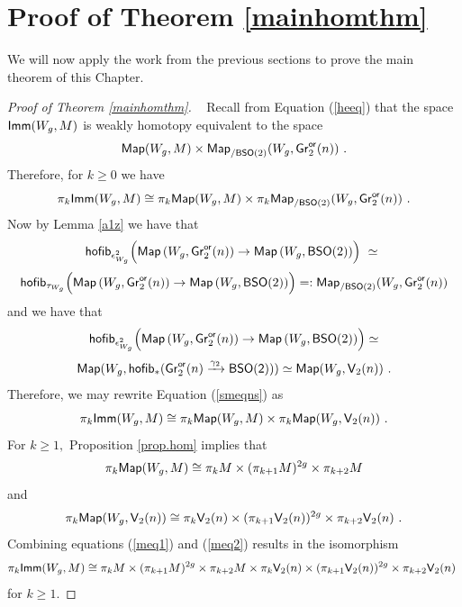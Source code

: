 














\section{Proof of Theorem \ref{mainhomthm}} \label{tmain}
We will now apply the work from the previous sections to prove the main theorem of this Chapter. \newline
\begin{proof}[Proof of Theorem \ref{mainhomthm}] ~\newline \newline
Recall from Equation (\ref{heeq}) that the space ${\sf Imm}(W_{g}, M)$ is weakly homotopy equivalent to the space \[
{\sf Map}(W_{g}, M) \times {\sf Map}_{/{\sf BSO}(2)}(W_{g}, \operatorname{\sf Gr}_2^{\sf or}(n))~.
\]
Therefore, for $k \geq 0$ we have 
\begin{equation} \label{smeqns}
\pi_{k}{\sf Imm}(W_{g}, M) \cong \pi_{k}{\sf Map}(W_{g}, M) \times \pi_{k}{\sf Map}_{/{\sf BSO}(2)}(W_{g}, \operatorname{\sf Gr}_2^{\sf or}(n))~.
\end{equation}
Now by Lemma \ref{a1z} we have that 
\small
\[
{\sf hofib}_{\epsilon^2_{W_g}} \Bigl(
\operatorname{{\sf Map}}\left( W_g , \operatorname{\sf Gr}^{\sf or}_2(n) \right) 
\to
\operatorname{{\sf Map}}\left( W_g , {\sf BSO}(2) \right) 
\Bigr)
~\simeq~
\]
\[
{\sf hofib}_{\tau_{W_g}} \Bigl(
\operatorname{{\sf Map}}\left( W_g , {\sf Gr}^{\sf or}_2(n) \right) 
\to
\operatorname{{\sf Map}}\left( W_g , {\sf BSO}(2) \right) 
\Bigr) =: {\sf Map}_{/ \sf BSO(2)}(W_{g}, {\sf Gr}_{2}^{\sf or}(n))
\]
and we have that
\[
{\sf hofib}_{\epsilon^2_{W_g}} \Bigl(
\operatorname{{\sf Map}}\left( W_g , {\sf Gr}^{\sf or}_2(n) \right) 
\to
\operatorname{{\sf Map}}\left( W_g , {\sf BSO}(2) \right) 
\Bigr) \simeq 
\]
\[
{\sf Map}(W_{g}, {\sf hofib}_{\ast}(\operatorname{\sf Gr}^{\sf or}_2(n) \xrightarrow{\gamma_{2}} {\sf BSO(2)})) \simeq {\sf Map}(W_{g}, \mathsf V_{2}(n)) ~.
\]
Therefore, we may rewrite Equation (\ref{smeqns}) as 
\begin{equation} \label{smeqns1}
\pi_{k}{\sf Imm}(W_{g}, M) \cong \pi_{k}{\sf Map}(W_{g}, M) \times \pi_{k}{\sf Map}(W_{g}, \mathsf V_{2}(n))~.
\end{equation}
For $k \geq 1,$ Proposition \ref{prop.hom} implies that 
\begin{equation}\label{meq1}
\pi_{k}{\sf Map}(W_{g}, M) \cong \pi_{k}M \times (\pi_{k + 1}M)^{2g} \times \pi_{k+2}M
\end{equation}
and
\begin{equation} \label{meq2}
\pi_{k}{\sf Map}(W_{g}, \mathsf V_{2}(n)) \cong \pi_{k}\mathsf V_{2}(n) \times (\pi_{k + 1}\mathsf V_{2}(n))^{2g} \times \pi_{k+2}\mathsf V_{2}(n)~.
\end{equation}
Combining equations (\ref{meq1}) and (\ref{meq2}) results in the isomorphism 
\[
\pi_{k}{\sf Imm}(W_{g}, M) \cong \pi_{k}M \times (\pi_{k + 1}M)^{2g} \times \pi_{k+2}M \times
\pi_{k}\mathsf V_{2}(n) \times (\pi_{k + 1}\mathsf V_{2}(n))^{2g} \times \pi_{k+2}\mathsf V_{2}(n)~
\]
for $k \geq 1.$



\end{proof}
